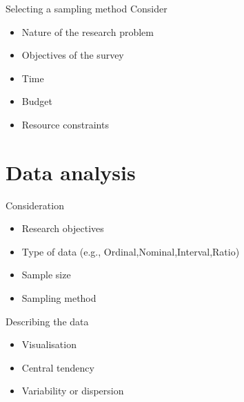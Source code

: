 \documentclass[10pt, compress]{beamer}
\begin{document}
\begin{frame}[t]{Selecting a sampling method}
    Consider
    \begin{itemize}
        \item Nature of the research problem
        \item Objectives of the survey
        \item Time
        \item Budget
        \item Resource constraints
    \end{itemize}
\end{frame}



\section{Data analysis}

\begin{frame}[t]{Consideration}
    \begin{itemize}
        \item Research objectives
        \item Type of data (e.g., Ordinal,Nominal,Interval,Ratio)
        \item Sample size
        \item Sampling method
    \end{itemize}
\end{frame}

\begin{frame}[t]{Describing the data}
    \begin{itemize}
        \item Visualisation
        \item Central tendency
        \item Variability or dispersion
    \end{itemize}
\end{frame}
\end{document}
